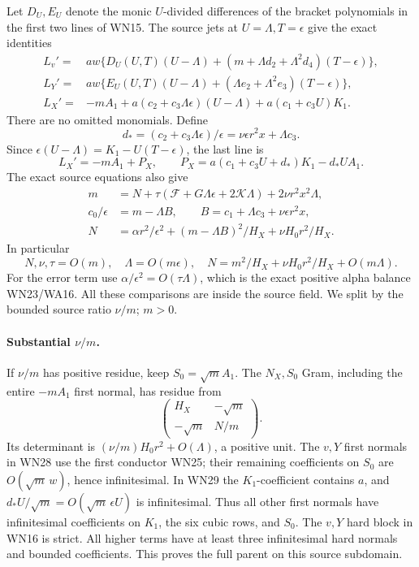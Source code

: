 Let \(D_U,E_U\) denote the monic \(U\)-divided differences of
the bracket polynomials in the first two lines of WN15.
The source jets at \(U=\Lambda,T=\epsilon\) give the exact
identities
\[
\begin{aligned}
 L_v'={}&aw\{D_U(U,T)(U-\Lambda)
                 +(m+\Lambda d_2+\Lambda^2d_4)(T-\epsilon)\},\\
 L_Y'={}&aw\{E_U(U,T)(U-\Lambda)
                 +(\Lambda e_2+\Lambda^2e_3)(T-\epsilon)\},\\
 L_X'={}&-mA_1+
       a(c_2+c_3\Lambda\epsilon)(U-\Lambda)
                  +a(c_1+c_3U)K_1 .
\end{aligned}\tag{WN28}
\]
There are no omitted monomials. Define
\[
 d_*=(c_2+c_3\Lambda\epsilon)/\epsilon
       =\nu\epsilon r^2x+\Lambda c_3 .
\]
Since \(\epsilon(U-\Lambda)=K_1-U(T-\epsilon)\), the last line is
\[
 L_X'=-mA_1+P_X,\qquad
 P_X=a(c_1+c_3U+d_*)K_1-d_*UA_1 .
 \tag{WN29}
\]
The exact source equations also give
\[
\begin{aligned}
 m&=N+\tau(\mathcal F+G\Lambda\epsilon+2\mathcal K\Lambda)
                            +2\nu r^2x^2\Lambda,\\
 c_0/\epsilon&=m-\Lambda B,\qquad
 B=c_1+\Lambda c_3+\nu\epsilon r^2x,\\
 N&=\alpha r^2/\epsilon^2+
             (m-\Lambda B)^2/H_X+\nu H_0r^2/H_X .
\end{aligned}\tag{WN30}
\]
In particular
\[
 N,\nu,\tau=O(m),\quad \Lambda=O(m\epsilon),\quad
 N=m^2/H_X+\nu H_0r^2/H_X+O(m\Lambda).
 \tag{WN31}
\]
For the error term use \(\alpha/\epsilon^2=O(\tau\Lambda)\),
which is the exact positive alpha balance WN23/WA16.
All these comparisons are inside the source field.
We split by the bounded source ratio \(\nu/m\); \(m>0\).

\paragraph{Substantial \(\nu/m\).}
If \(\nu/m\) has positive residue, keep \(S_0=\sqrt m A_1\).
The \(N_X,S_0\) Gram, including the entire \(-mA_1\) first
normal, has residue from
\[
 \begin{pmatrix}H_X&-\sqrt m\\-\sqrt m&N/m\end{pmatrix}.
 \tag{WN32}
\]
Its determinant is
\((\nu/m)H_0r^2+O(\Lambda)\), a positive unit.
The \(v,Y\) first normals in WN28 use the first conductor WN25;
their remaining coefficients on \(S_0\) are
\(O(\sqrt m\,w)\), hence infinitesimal.
In WN29 the \(K_1\)-coefficient contains \(a\), and
\(d_*U/\sqrt m=O(\sqrt m\,\epsilon U)\) is infinitesimal.
Thus all other first normals have infinitesimal coefficients
on \(K_1\), the six cubic rows, and \(S_0\).
The \(v,Y\) hard block in WN16 is strict. All higher terms have
at least three infinitesimal hard normals and bounded coefficients.
This proves the full parent on this source subdomain.

